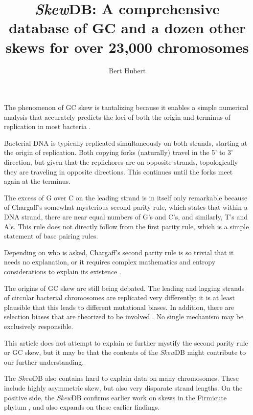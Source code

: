 \documentclass[9pt,twocolumn,twoside]{pnas-new}
\title{\emph{Skew}DB: A comprehensive database of GC and a dozen other skews for over 23,000 chromosomes}
\author[a]{Bert Hubert}
\begin{document}
\maketitle
\thispagestyle{firststyle}

The phenomenon of GC skew is tantalizing because it enables a simple numerical analysis that accurately predicts the loci of both the origin and terminus of replication in most bacteria \cite{lu_skewit_2020} \cite{luo_doric_2019}.

Bacterial DNA is typically replicated simultaneously on both strands, starting at the origin of replication. Both copying forks (naturally) travel in the 5' to 3' direction, but given that the replichores are on opposite strands, topologically they are traveling in opposite directions. This continues until the forks meet again at the terminus.

The excess of G over C on the leading strand is in itself only remarkable because of Chargaff's somewhat mysterious second parity rule, which states that within a DNA strand, there are near equal numbers of G's and C's, and similarly, T's and A's. This rule does not directly follow from the first parity rule, which is a simple statement of base pairing rules.

Depending on who is asked, Chargaff's second parity rule is so trivial that it needs no explanation, or it requires complex mathematics and entropy considerations to explain its existence \cite{fariselli_dna_2020}.

The origins of GC skew are still being debated. The leading and lagging strands of circular bacterial chromosomes are replicated very differently; it is at least plausible that this leads to different mutational biases. In addition, there are selection biases that are theorized to be involved \cite{tillier_contributions_2000}. No single mechanism may be exclusively responsible.

This article does not attempt to explain or further mystify \cite{zhang_brief_2014} the second parity rule or GC skew, but it may be that the contents of the \emph{Skew}DB might contribute to our further understanding.

The \emph{Skew}DB also contains hard to explain data on many chromosomes. These include highly asymmetric skew, but also very disparate strand lengths. On the positive side, the \emph{Skew}DB confirms earlier work on skews in the Firmicute phylum  \cite{charneski_atypical_2011}, and also expands on these earlier findings.
\end{document}
